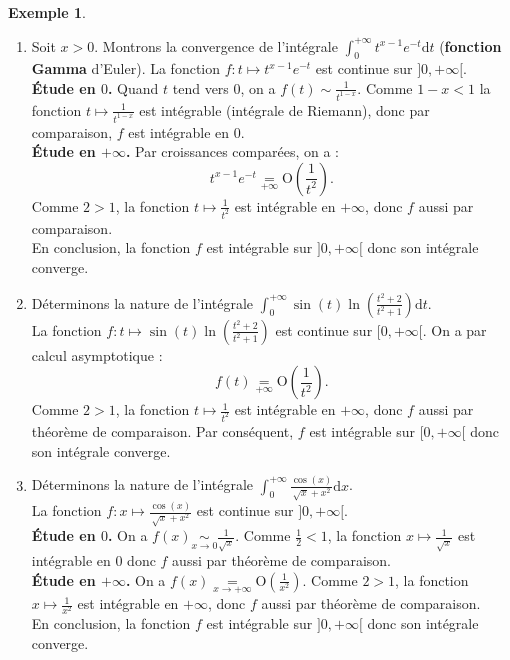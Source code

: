 \documentclass[french]{article}
\renewcommand{\O}{\text{O}}
\renewcommand{\d}{\text{d}}
\theoremstyle{plain}
\theoremstyle{definition}
\newtheorem*{ex}{Exemple}
\theoremstyle{remark}
\begin{document}
\begin{ex}
	\begin{enumerate}
		\item Soit $x>0$. Montrons la convergence de l'intégrale $\displaystyle\int_{0}^{+\infty}t^{x-1}e^{-t}\d t$ (\textbf{fonction Gamma} d'Euler). La fonction $f:t\mapsto t^{x-1}e^{-t}$ est continue sur $]0,+\infty[$.\\
		\textbf{Étude en $0$.} Quand $t$ tend vers $0$, on a $f(t)\sim\displaystyle\frac{1}{t^{1-x}}$. Comme $1-x<1$ la fonction $t\mapsto\displaystyle\frac{1}{t^{1-x}}$ est intégrable (intégrale de Riemann), donc par comparaison, $f$ est intégrable en $0$.\\
		\textbf{Étude en $+\infty$.} Par croissances comparées, on a : $$t^{x-1}e^{-t}\underset{+\infty}{=}\O\left(\frac{1}{t^2}\right).$$
		Comme $2>1$, la fonction $t\mapsto\displaystyle\frac{1}{t^2}$ est intégrable en $+\infty$, donc $f$ aussi par comparaison. \\
		En conclusion, la fonction $f$ est intégrable sur $]0,+\infty[$ donc son intégrale converge.
		
		\item Déterminons la nature de l'intégrale $\displaystyle\int_{0}^{+\infty}\sin(t)\ln\left(\frac{t^2+2}{t^2+1}\right)\d t$.\\
		La fonction $f:t\mapsto\displaystyle\sin(t)\ln\left(\frac{t^2+2}{t^2+1}\right)$ est continue sur $[0,+\infty[$. On a par calcul asymptotique : $$f(t)\underset{+\infty}{=}\O\left(\frac{1}{t^2}\right).$$
		Comme $2>1$, la fonction $t\mapsto\displaystyle\frac{1}{t^2}$ est intégrable en $+\infty$, donc $f$ aussi par théorème de comparaison. Par conséquent, $f$ est intégrable sur $[0,+\infty[$ donc son intégrale converge.
		
		\item Déterminons la nature de l'intégrale $\displaystyle\int_{0}^{+\infty}\frac{\cos(x)}{\sqrt{x}+x^2}\d x$.\\
		La fonction $f:x\mapsto\displaystyle\frac{\cos(x)}{\sqrt{x}+x^2}$ est continue sur $]0,+\infty[$.\\
		\textbf{Étude en $0$.} On a $f(x)\underset{x\to 0}{\sim}\frac{1}{\sqrt{x}}$. Comme $\displaystyle\frac12<1$, la fonction $\displaystyle x\mapsto\frac{1}{\sqrt{x}}$ est intégrable en $0$ donc $f$ aussi par théorème de comparaison.\\
		\textbf{Étude en $+\infty$.} On a $f(x)\displaystyle\underset{x\to+\infty}{=}\O\left(\frac{1}{x^2}\right)$. Comme $2>1$, la fonction $x\mapsto\displaystyle\frac{1}{x^2}$ est intégrable en $+\infty$, donc $f$ aussi par théorème de comparaison.\\
		En conclusion, la fonction $f$ est intégrable sur $]0,+\infty[$ donc son intégrale converge.
	\end{enumerate}
\end{ex}
\end{document}

